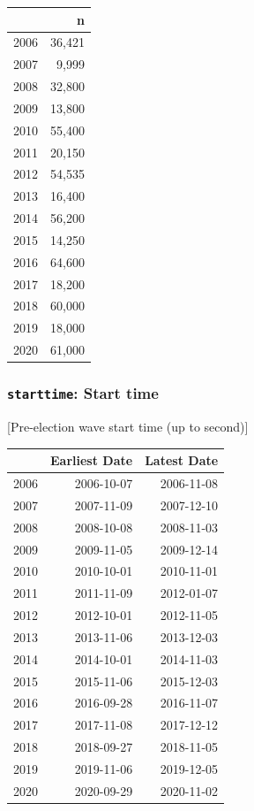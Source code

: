 \documentclass[10pt,article,oneside]{memoir}
\theoremstyle{definition}
\begin{document}
\begin{table}[H]
\centering
\begin{tabular}[t]{lr}
\toprule
 & n\\
\midrule
2006 & 36,421\\
2007 & 9,999\\
2008 & 32,800\\
2009 & 13,800\\
2010 & 55,400\\
2011 & 20,150\\
2012 & 54,535\\
2013 & 16,400\\
2014 & 56,200\\
2015 & 14,250\\
2016 & 64,600\\
2017 & 18,200\\
2018 & 60,000\\
2019 & 18,000\\
2020 & 61,000\\
\bottomrule
\end{tabular}
\end{table}

\hypertarget{starttime-start-time}{%
\subsubsection{\texorpdfstring{\texttt{starttime}: Start
time}{starttime: Start time}}\label{starttime-start-time}}

{[}Pre-election wave start time (up to second){]}

\begin{table}
\centering
\begin{tabular}{lrr}
\toprule
 & Earliest Date & Latest Date\\
\midrule
2006 & 2006-10-07 & 2006-11-08\\
2007 & 2007-11-09 & 2007-12-10\\
2008 & 2008-10-08 & 2008-11-03\\
2009 & 2009-11-05 & 2009-12-14\\
2010 & 2010-10-01 & 2010-11-01\\
2011 & 2011-11-09 & 2012-01-07\\
2012 & 2012-10-01 & 2012-11-05\\
2013 & 2013-11-06 & 2013-12-03\\
2014 & 2014-10-01 & 2014-11-03\\
2015 & 2015-11-06 & 2015-12-03\\
2016 & 2016-09-28 & 2016-11-07\\
2017 & 2017-11-08 & 2017-12-12\\
2018 & 2018-09-27 & 2018-11-05\\
2019 & 2019-11-06 & 2019-12-05\\
2020 & 2020-09-29 & 2020-11-02\\
\bottomrule
\end{tabular}
\end{table}
\end{document}
